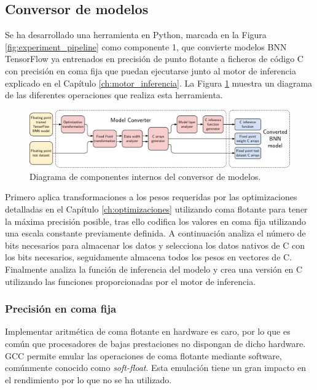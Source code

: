 \subsection{Conversor de modelos}

Se ha desarrollado una herramienta en Python, marcada en la Figura \ref{fig:experiment_pipeline} como componente 1, que convierte modelos BNN TensorFlow ya entrenados en precisión de punto flotante a ficheros de código C con precisión en coma fija que puedan ejecutarse junto al motor de inferencia explicado en el Capítulo \ref{ch:motor_inferencia}. La Figura \ref{fig:model_converter} muestra un diagrama de las diferentes operaciones que realiza esta herramienta.

\begin{figure}[h]
	\centering
	\includegraphics[width=\textwidth]{root/Imagenes/metodologia/model_converter.pdf}
	\caption{Diagrama de componentes internos del conversor de modelos.}
	\label{fig:model_converter}
\end{figure}

Primero aplica transformaciones a los pesos requeridas por las optimizaciones detalladas en el Capítulo \ref{ch:optimizaciones} utilizando coma flotante para tener la máxima precisión posible, tras ello codifica los valores en coma fija utilizando una escala constante previamente definida. A continuación analiza el número de bits necesarios para almacenar los datos y selecciona los datos nativos de C con los bits necesarios, seguidamente almacena todos los pesos en vectores de C. Finalmente analiza la función de inferencia del modelo y crea una versión en C utilizando las funciones proporcionadas por el motor de inferencia.

\subsubsection{Precisión en coma fija}

Implementar aritmética de coma flotante en hardware es caro, por lo que es común que procesadores de bajas prestaciones no dispongan de dicho hardware. GCC permite emular las operaciones de coma flotante mediante software, comúnmente conocido como \textit{soft-float}. Esta emulación tiene un gran impacto en el rendimiento por lo que no se ha utilizado.

